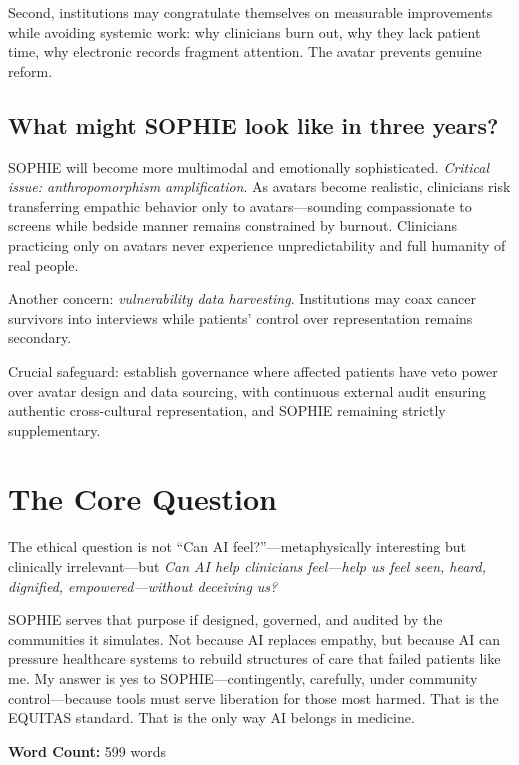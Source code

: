 \documentclass[12pt,twoside]{article}
\begin{document}
Second, institutions may congratulate themselves on measurable improvements while avoiding systemic work: why clinicians burn out, why they lack patient time, why electronic records fragment attention. The avatar prevents genuine reform.

\subsection*{What might SOPHIE look like in three years?}

SOPHIE will become more multimodal and emotionally sophisticated. \emph{Critical issue: anthropomorphism amplification}. As avatars become realistic, clinicians risk transferring empathic behavior only to avatars—sounding compassionate to screens while bedside manner remains constrained by burnout. Clinicians practicing only on avatars never experience unpredictability and full humanity of real people.

Another concern: \emph{vulnerability data harvesting}. Institutions may coax cancer survivors into interviews while patients' control over representation remains secondary.

Crucial safeguard: establish governance where affected patients have veto power over avatar design and data sourcing, with continuous external audit ensuring authentic cross-cultural representation, and SOPHIE remaining strictly supplementary.

\section*{The Core Question}

The ethical question is not \enquote{Can AI feel?}—metaphysically interesting but clinically irrelevant—but \emph{Can AI help clinicians feel—help us feel seen, heard, dignified, empowered—without deceiving us?}

SOPHIE serves that purpose if designed, governed, and audited by the communities it simulates. Not because AI replaces empathy, but because AI can pressure healthcare systems to rebuild structures of care that failed patients like me. My answer is yes to SOPHIE—contingently, carefully, under community control—because tools must serve liberation for those most harmed. That is the EQUITAS standard. That is the only way AI belongs in medicine.

\vfill
\noindent\centering\footnotesize\textbf{Word Count:} 599 words
\end{document}
